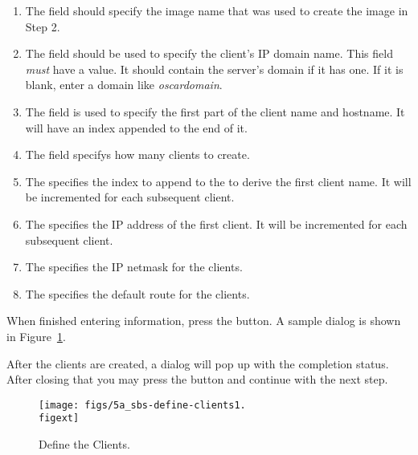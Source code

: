\begin{enumerate}

\item The  field should specify the image name that was used to 
create the image in Step 2.

\item The  field should be used to specify the client's IP
domain name. This field \emph{must} have a value. It should contain the server's
domain if it has one. If it is blank, enter a domain like \emph{oscardomain}.

\item The  field is used to specify the first part of the 
client name and hostname. It will have an index appended to the end of it.

\item The  field specifys how many clients to create.

\item The  specifies the index to append
to the  to derive the first client name. It will be incremented
for each subsequent client.

\item The  specifies the IP address of the first client. It 
will be incremented for each subsequent client.

\item The  specifies the IP netmask for the clients.

\item The  specifies the default route for the clients.

\end{enumerate}
  
When finished entering information, press the  button.
A sample dialog is shown in Figure~\ref{fig:detailed-define-clients}. 

After the clients are created,
a dialog will pop up with the completion status. After closing that 
you may press the  button and continue with the next step.

\begin{figure}[htbp]
  \begin{center}
    \texttt{[image: figs/5a\_sbs-define-clients1.\\figext]}
    \caption{Define the Clients.}
    \label{fig:detailed-define-clients}
  \end{center}
\end{figure}
    
